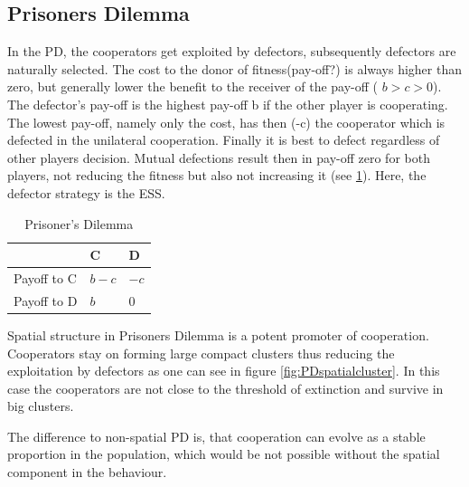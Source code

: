 \documentclass[DIV=calc, paper=a4, fontsize=11pt, twocolumn]{scrartcl}	 %
\begin{document}


\subsection*{Prisoners Dilemma}

In the PD, the cooperators get exploited by defectors, subsequently defectors are naturally selected. The cost to the donor of fitness(pay-off?) is always higher than zero, but generally lower the benefit to the receiver of the pay-off ( $b > c > 0 $). The defector's pay-off is the highest pay-off b if the other player is cooperating. The lowest pay-off, namely only the cost, has then (-c) the cooperator which is defected in the unilateral cooperation. Finally it is best to defect regardless of other players decision. Mutual defections result then in pay-off zero for both players, not reducing the fitness but also not increasing it (see \ref{table1}). Here, the defector strategy is the ESS. 

\begin{table}[h]
\caption{Prisoner's Dilemma}
\label{table1}
\centering
\begin{tabular}{lll}
 & C & D \\
\midrule
Payoff to C & $b-c$ & $-c$ \\
Payoff to D & $b$ & $0$ \\
\bottomrule
\end{tabular}
\end{table}

Spatial structure in Prisoners Dilemma is a potent promoter of cooperation. Cooperators stay on forming large compact clusters thus reducing the exploitation by defectors as one can see in figure \ref{fig:PDspatialcluster}. In this case the cooperators are not close to the threshold of extinction and survive in big clusters. 

The difference to non-spatial PD is, that cooperation can evolve as a stable proportion in the population, which would be not possible without the spatial component in the behaviour. 
\end{document}
